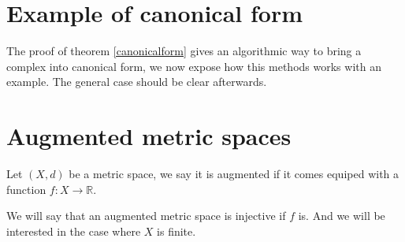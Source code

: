 


%
%
%
%
%
%
%
%


\section{Example of canonical form}

The proof of theorem \ref{canonicalform} gives an
algorithmic way to bring a complex into canonical form, 
we now expose how this methods works with an example. 
The general case should be clear afterwards.

\section{Augmented metric spaces}

\begin{definition}
Let $(X,d)$ be a metric space,
we say it is augmented if it comes equiped with a function 
$f:X\to\mathbb{R}$.

\end{definition}

We will say that an augmented metric space is injective if $f$ is.
And we will be interested in the case where $X$ is finite.


